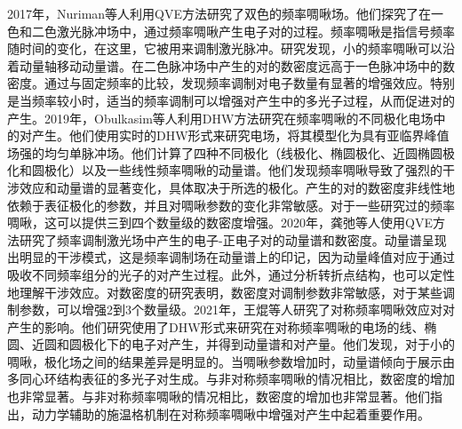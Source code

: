2017年，Nuriman等人利用QVE方法研究了双色的频率啁啾场\cite{2017c}。他们探究了在一色和二色激光脉冲场中，通过频率啁啾产生电子对的过程。频率啁啾是指信号频率随时间的变化，在这里，它被用来调制激光脉冲。研究发现，小的频率啁啾可以沿着动量轴移动动量谱。在二色脉冲场中产生的对的数密度远高于一色脉冲场中的数密度。通过与固定频率的比较，发现频率调制对电子数量有显著的增强效应。特别是当频率较小时，适当的频率调制可以增强对产生中的多光子过程，从而促进对的产生。2019年，Obulkasim等人利用DHW方法研究在频率啁啾的不同极化电场中的对产生\cite{2019c}。他们使用实时的DHW形式来研究电场，将其模型化为具有亚临界峰值场强的均匀单脉冲场。他们计算了四种不同极化（线极化、椭圆极化、近圆椭圆极化和圆极化）以及一些线性频率啁啾的动量谱。他们发现频率啁啾导致了强烈的干涉效应和动量谱的显著变化，具体取决于所选的极化。产生的对的数密度非线性地依赖于表征极化的参数，并且对啁啾参数的变化非常敏感。对于一些研究过的频率啁啾，这可以提供三到四个数量级的数密度增强。2020年，龚弛等人使用QVE方法研究了频率调制激光场中产生的电子-正电子对的动量谱和数密度\cite{2020cg}。动量谱呈现出明显的干涉模式，这是频率调制场在动量谱上的印记，因为动量峰值对应于通过吸收不同频率组分的光子的对产生过程。此外，通过分析转折点结构，也可以定性地理解干涉效应。对数密度的研究表明，数密度对调制参数非常敏感，对于某些调制参数，可以增强2到3个数量级。2021年，王焜等人研究了对称频率啁啾效应对对产生的影响\cite{2021cw}。他们研究使用了DHW形式来研究在对称频率啁啾的电场的线、椭圆、近圆和圆极化下的电子对产生，并得到动量谱和对产量。他们发现，对于小的啁啾，极化场之间的结果差异是明显的。当啁啾参数增加时，动量谱倾向于展示由多同心环结构表征的多光子对生成。与非对称频率啁啾的情况相比，数密度的增加也非常显著。与非对称频率啁啾的情况相比，数密度的增加也非常显著。他们指出，动力学辅助的施温格机制在对称频率啁啾中增强对产生中起着重要作用。

